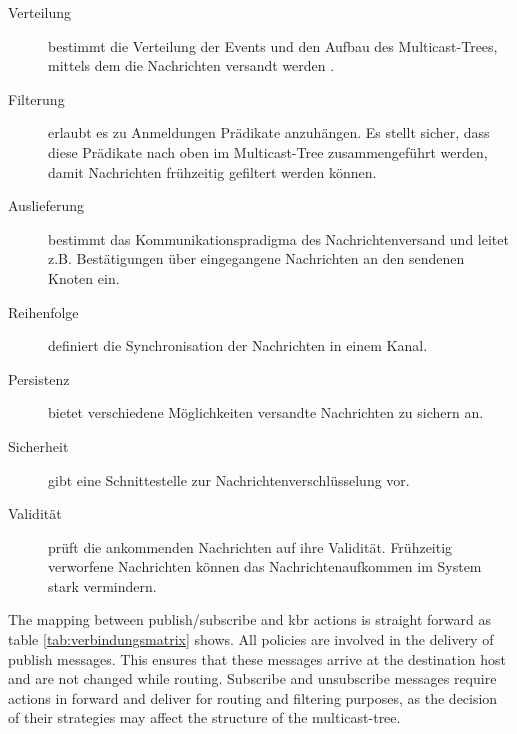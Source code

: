 \begin{description}
\item[Verteilung] bestimmt die Verteilung der Events und den Aufbau des Multicast-Trees, mittels dem die Nachrichten versandt werden \cite{KostasKatrinis2005}.
\item[Filterung] erlaubt es zu Anmeldungen Prädikate anzuhängen. Es stellt sicher, dass diese Prädikate nach oben im Multicast-Tree zusammengeführt werden, damit Nachrichten frühzeitig gefiltert werden können.
\item[Auslieferung] bestimmt das Kommunikationspradigma des Nachrichtenversand und leitet z.B. Bestätigungen über eingegangene Nachrichten an den sendenen Knoten ein.
\item[Reihenfolge] definiert die Synchronisation der Nachrichten in einem Kanal.
\item[Persistenz] bietet verschiedene Möglichkeiten versandte Nachrichten zu sichern an.
\item[Sicherheit] gibt eine Schnittestelle zur Nachrichtenverschlüsselung vor.
\item[Validität] prüft die ankommenden Nachrichten auf ihre Validität. Frühzeitig verworfene Nachrichten können das Nachrichtenaufkommen im System stark vermindern.
\end{description}


The mapping between publish/subscribe and \ac{kbr} actions is straight forward as table \ref{tab:verbindungsmatrix} shows. All policies are involved in the delivery of publish messages. This ensures that these messages arrive at the destination host and are not changed while routing. Subscribe and unsubscribe messages require actions in forward and deliver for routing and filtering purposes, as the decision of their strategies may affect the structure of the multicast-tree.

\begin{table}[!h]
\caption{Verbindungsmatrix}
\label{tab:verbindungsmatrix}
\end{table}


